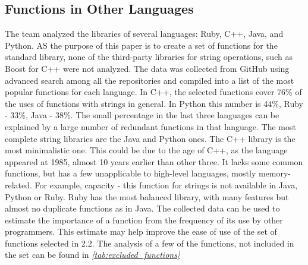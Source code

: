 \documentclass[11pt,nonacm,natbib=false]{acmart}
\begin{document}
\subsection{Functions in Other Languages}
The team analyzed the libraries of several languages: Ruby, C++, Java, and Python. AS the purpose of this paper is to create a set of functions for the standard library, none of the third-party libraries for string operations, such as Boost for C++ were not analyzed.
The data was collected from GitHub using advanced search among all the repositories and compiled into a list of the most popular functions for each language.
In C++, the selected functions cover 76\% of the uses of functions with strings in general. 
In Python this number is 44\%, Ruby - 33\%, Java - 38\%. 
The small percentage in the last three languages can be explained by a large number of redundant functions in that language. 
The most complete string libraries are the Java and Python ones. The C++ library is the most minimalistic one. 
This could be due to the age of C++, as the language appeared at 1985, almost 10 years earlier than other three. It lacks some common functions, but has a few unapplicable to high-level languages, mostly memory-related. 
For example, capacity - this function for strings is not available in Java, Python or Ruby. 
Ruby has the most balanced library, with many features but almost no duplicate functions
as in Java.
The collected data can be used to estimate the importance of a function from the frequency of its use by other programmers. This estimate may help improve the ease of use of the set of functions selected in 2.2. The analysis of a few of the functions, not included in the set can be found in \emph{\autoref{tab:excluded_functions}}
\end{document}

